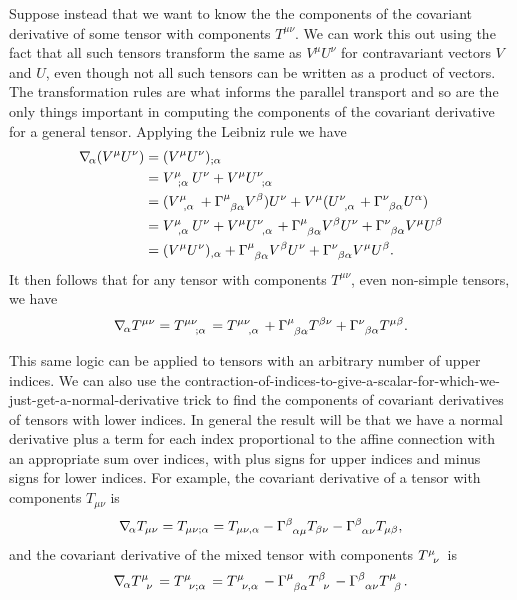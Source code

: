 \documentclass[fleqn]{NotesClass}
\newcommand*{\christoffel}[3]{\tensor{\Gamma}{^{#1}_{{#2}{#3}}}}
\newcommand*{\covariantDerivative}[1]{\nabla_{\!#1}}
\begin{document}
    Suppose instead that we want to know the the components of the covariant derivative of some tensor with components \(T^{\mu\nu}\).
    We can work this out using the fact that all such tensors transform the same as \(V^\mu U^\nu\) for contravariant vectors \(V\) and \(U\), even though not all such tensors can be written as a product of vectors.
    The transformation rules are what informs the parallel transport and so are the only things important in computing the components of the covariant derivative for a general tensor.
    Applying the Leibniz rule we have
    \begin{align}
        \covariantDerivative{\alpha} (V^\mu U^\nu) &= (V^\mu U^\nu)_{;\alpha}\\
        &= \tensor{V}{^\mu_{;\alpha}} U^\nu + V^\mu \tensor{U}{^\nu_{;\alpha}}\\
        &= (\tensor{V}{^\mu_{,\alpha}} + \christoffel{\mu}{\beta}{\alpha} V^\beta) U^\nu + V^\mu (\tensor{U}{^\nu_{,\alpha}} + \christoffel{\nu}{\beta}{\alpha}U^\alpha)\\
        &= \tensor{V}{^\mu_{,\alpha}}U^\nu + V^\mu\tensor{U}{^\nu_{,\alpha}} + \christoffel{\mu}{\beta}{\alpha} V^\beta U^\nu + \christoffel{\nu}{\beta}{\alpha} V^\mu U^\beta\\
        &= (V^\mu U^\nu)_{,\alpha} + \christoffel{\mu}{\beta}{\alpha} V^\beta U^\nu + \christoffel{\nu}{\beta}{\alpha} V^\mu U^\beta.
    \end{align}
    It then follows that for any tensor with components \(T^{\mu\nu}\), even non-simple tensors, we have
    \begin{equation}
        \covariantDerivative{\alpha} T^{\mu\nu} = \tensor{T}{^{\mu\nu}_{;\alpha}} = \tensor{T}{^{\mu\nu}_{,\alpha}} + \christoffel{\mu}{\beta}{\alpha} T^{\beta\nu} + \christoffel{\nu}{\beta}{\alpha} T^{\mu\beta}.
    \end{equation}
    
    This same logic can be applied to tensors with an arbitrary number of upper indices.
    We can also use the contraction-of-indices-to-give-a-scalar-for-which-we-just-get-a-normal-derivative trick to find the components of covariant derivatives of tensors with lower indices.
    In general the result will be that we have a normal derivative plus a term for each index proportional to the affine connection with an appropriate sum over indices, with plus signs for upper indices and minus signs for lower indices.
    For example, the covariant derivative of a tensor with components \(T_{\mu\nu}\) is
    \begin{equation}
        \covariantDerivative{\alpha} T_{\mu\nu} = T_{\mu\nu;\alpha} = T_{\mu\nu,\alpha} - \christoffel{\beta}{\alpha}{\mu} T_{\beta\nu} - \christoffel{\beta}{\alpha}{\nu} T_{\mu\beta},
    \end{equation}
    and the covariant derivative of the mixed tensor with components \(\tensor{T}{^\mu_\nu}\) is
    \begin{equation}
        \covariantDerivative{\alpha} \tensor{T}{^\mu_\nu} = \tensor{T}{^\mu_{\nu;\alpha}} = \tensor{T}{^\mu_{\nu,\alpha}} - \christoffel{\mu}{\beta}{\alpha}\tensor{T}{^\beta_\nu} - \christoffel{\beta}{\alpha}{\nu} \tensor{T}{^\mu_\beta}.
    \end{equation}
    
\end{document}
